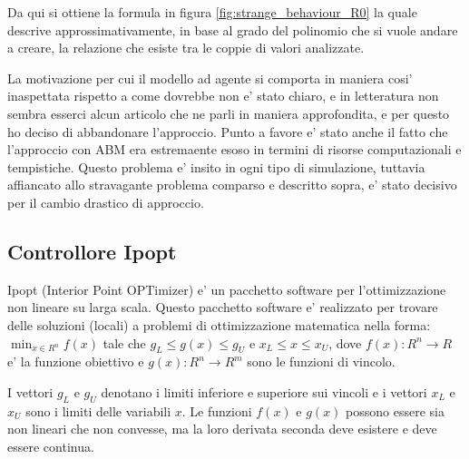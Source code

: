 Da qui si ottiene la formula in figura \ref{fig:strange_behaviour_R0} la quale descrive approssimativamente, 
in base al grado del polinomio che si vuole andare a creare, la relazione che esiste tra le coppie 
di valori analizzate.

La motivazione per cui il modello ad agente si comporta in maniera cosi' inaspettata
rispetto a come dovrebbe non e' stato chiaro, e in letteratura non sembra esserci alcun 
articolo che ne parli in maniera approfondita, e per questo ho deciso di abbandonare l'approccio.
Punto a favore e' stato anche il fatto che l'approccio con ABM era estremaente esoso in termini 
di risorse computazionali e tempistiche. Questo problema e' insito in ogni tipo di simulazione, 
tuttavia affiancato allo stravagante problema comparso e descritto sopra, e' stato 
decisivo per il cambio drastico di approccio. 

\subsection{Controllore Ipopt}
Ipopt (Interior Point OPTimizer) \cite{Wächter2006} e' un pacchetto software per 
l'ottimizzazione non lineare su larga scala. Questo pacchetto software e' realizzato 
per trovare delle soluzioni (locali) a problemi di ottimizzazione matematica nella forma:
$\min_{x \in R^n} f(x)$ tale che $g_L \leq g(x) \leq g_U$ e $x_L \leq x \leq x_U$, dove 
$f(x): R^n \rightarrow R$ e' la funzione obiettivo e $g(x): R^n \rightarrow R^m$ 
sono le funzioni di vincolo.

I vettori $g_L$ e $g_U$ denotano i limiti inferiore e superiore sui vincoli e i vettori
$x_L$ e $x_U$ sono i limiti delle variabili $x$. Le funzioni $f(x)$ e $g(x)$ possono essere 
sia non lineari che non convesse, ma la loro derivata seconda deve esistere e deve essere 
continua.

